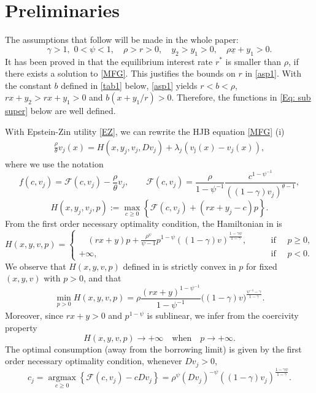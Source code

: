 \documentclass[11pt]{article}
\numberwithin{equation}{section}
\numberwithin{algorithm}{section}
\newcommand{\ux}{{\underline x}}
\newcommand{\beq}{\begin{equation}}
\newcommand{\eeq}{\end{equation}}
\newcommand{\g}{\gamma}
\newcommand{\p}{\psi}
\theoremstyle{plain}
\begin{document}
\section{Preliminaries}
The assumptions that follow will be made in the whole paper:
\beq\label{asp1}
\g>1,\,\,0<\p<1,\quad \rho> r>0,\quad y_2>y_1>0,\quad \rho \ux+y_1>0.
\eeq
It has been proved in \cite{Achdou:2026aa} that the equilibrium interest rate $r^*$ is smaller than $\rho$, if there exists a solution to \cref{MFG}. This justifies the bounds on $r$ in \cref{asp1}. With the constant $b$ defined in \cref{tab1} below, \cref{asp1} yields $r<b<\rho$, $rx+y_2>rx+y_1>0$ and $b(x+y_1/r)>0$. Therefore, the functions in \cref{Eq: sub super} below are well defined. \par  
With Epstein-Zin utility \eqref{EZ}, we can rewrite the HJB equation \cref{MFG} (i) 
	\beq\label{HJB}
	\begin{aligned}
	\frac{\rho}{\theta} v_j(x)=	H(x,y_j,v_j,Dv_j)+\lambda_j(v_{\bar \jmath}(x)-v_j(x)),
	\end{aligned}
	\eeq
	where we use the notation
	\beq\label{EZ flow}
	f(c,v_j)=\mathcal{F}(c,v_j)-\frac{\rho}{\theta} v_j,\qquad \mathcal{F}(c,v_j)=\frac{\rho}{1-\p^{-1}}\frac{c^{1-\p^{-1}}}{((1-\g)v_j)^{\theta-1}},
	\eeq
\beq\label{Eq: H from F}
 H(x,y_j,v_j,p):=\max_{c\ge 0} \left\{ \mathcal{F}(c,v_j) +(rx +y_j- c)p\right\}.
\eeq
From the first order necessary optimality condition, the Hamiltonian in  is
	\begin{equation}\label{def H}
  H(x,y,v,p)=\left\{
      \begin{aligned}
     \quad  (rx +y)p+\frac{\rho^{\p}}{\p-1} p^{1-\p}((1-\g)v)^{\frac{1-\g \p}{1-\g}},\quad \quad & \text{if }\quad p\geq 0,\\
       +\infty, \quad \quad  & \text{if }\quad p< 0.
     \end{aligned}
   \right.
\end{equation}
We observe that $H(x,y,v,p)$ defined in  is strictly convex in $p$ for fixed $(x,y,v)$ with $p>0$, and that
\beq\label{H min}
\min_{p>0}H(x,y,v,p)=\rho\frac{(rx+y)^{1-\p^{-1}}}{1-\p^{-1}}\big((1-\g)v\big)^{\frac{\p^{-1}-\g}{1-\g}}.
\eeq
Moreover, since $rx+y>0$ and $p^{1-\p}$ is sublinear, we infer from  the coercivity property
\beq\label{H coerc}
H(x,y,v,p)\to +\infty \quad \text{when}\quad  p\to +\infty.
\eeq
The optimal consumption (away from the borrowing limit) is given by the first order necessary optimality condition, whenever $Dv_j >0$, 
	\beq\label{c optimal}
	c_j=\mathop{\arg\max}\limits_{c\geq 0} \left\{ \mathcal{F}(c,v_j) -cDv_j \right\}=\rho^{\p}(Dv_j)^{-\p}((1-\g)v_j)^{\frac{1-\g \p}{1-\g}}.
	\eeq
\end{document}
